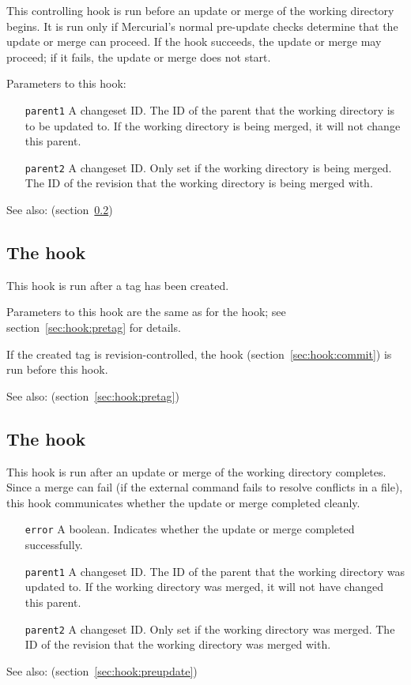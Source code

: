 This controlling hook is run before an update or merge of the working
directory begins.  It is run only if Mercurial's normal pre-update
checks determine that the update or merge can proceed.  If the hook
succeeds, the update or merge may proceed; if it fails, the update or
merge does not start.

Parameters to this hook:
\begin{itemize}
\item[\texttt{parent1}] A changeset ID.  The ID of the parent that the
  working directory is to be updated to.  If the working directory is
  being merged, it will not change this parent.
\item[\texttt{parent2}] A changeset ID.  Only set if the working
  directory is being merged.  The ID of the revision that the working
  directory is being merged with.
\end{itemize}

See also:  (section~\ref{sec:hook:update})

\subsection{The  hook}
\label{sec:hook:tag}

This hook is run after a tag has been created.

Parameters to this hook are the same as for the  hook;
see section~\ref{sec:hook:pretag} for details.

If the created tag is revision-controlled, the  hook
(section~\ref{sec:hook:commit}) is run before this hook.

See also:  (section~\ref{sec:hook:pretag})

\subsection{The  hook}
\label{sec:hook:update}

This hook is run after an update or merge of the working directory
completes.  Since a merge can fail (if the external 
command fails to resolve conflicts in a file), this hook communicates
whether the update or merge completed cleanly.

\begin{itemize}
\item[\texttt{error}] A boolean.  Indicates whether the update or
  merge completed successfully.
\item[\texttt{parent1}] A changeset ID.  The ID of the parent that the
  working directory was updated to.  If the working directory was
  merged, it will not have changed this parent.
\item[\texttt{parent2}] A changeset ID.  Only set if the working
  directory was merged.  The ID of the revision that the working
  directory was merged with.
\end{itemize}

See also:  (section~\ref{sec:hook:preupdate})


